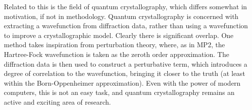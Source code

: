 \begin{refsection}
Related to this is the field of quantum crystallography, which differs somewhat in motivation, if not in methodology.
Quantum crystallography is concerned with extracting a wavefunction from diffraction data, rather than using a wavefunction to improve a crystallographic model.
Clearly there is significant overlap.
One method takes inspiration from perturbation theory, where, as in MP2, the Hartree-Fock wavefunction is taken as the zeroth order approximation.
The diffraction data is then used to construct a perturbative term, which introduces a degree of correlation to the wavefunction, bringing it closer to the truth (at least within the Born-Oppenheimer approximation).\autocite{Weiss1962}
Even with the power of modern computers, this is not an easy task, and quantum crystallography remains an active and exciting area of research.


\end{refsection}
